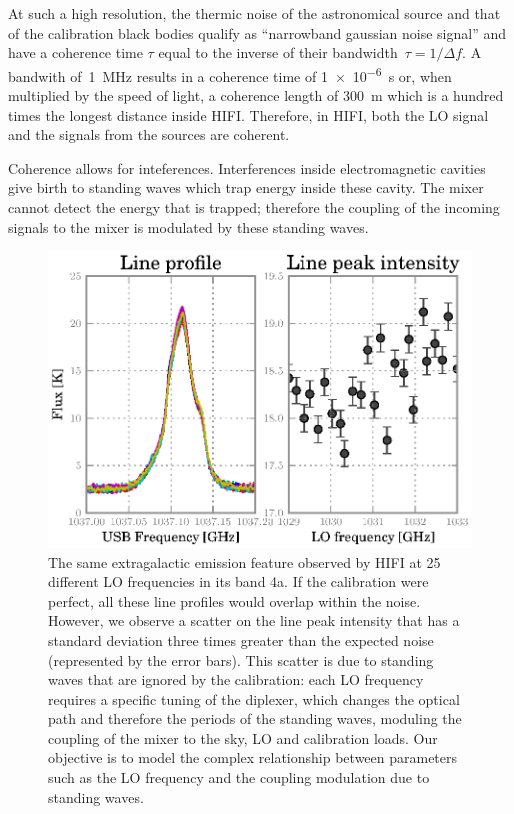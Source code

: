 \documentclass[a4paper,11pt]{article}
\begin{document}
At such a high resolution, the thermic noise of the astronomical source and that of the calibration black bodies qualify as ``narrowband gaussian noise signal'' \cite{siegman1986lasers} and have a coherence time $\tau$ equal to the inverse of their bandwidth~$\tau=1/\Delta f$.
A bandwith of~\SI{1}{\mega\hertz} results in a coherence time of \SI{1e-6}{\second} or, when multiplied by the speed of light, a coherence length of \SI{300}{\meter} which is a hundred times the longest distance inside HIFI.
Therefore, in HIFI, both the LO signal and the signals from the sources are coherent.

Coherence allows for inteferences.
Interferences inside electromagnetic cavities give birth to standing waves which trap energy inside these cavity.
The mixer cannot detect the energy that is trapped; 
therefore the coupling of the incoming signals to the mixer is modulated by these standing waves.

\begin{figure}[hbt]
    \centering
    \includegraphics[width=\textwidth]{obsid_5000352C}
    \caption{\label{fig:scatter_real_data}
    The same extragalactic emission feature observed by HIFI at 25 different LO frequencies in its band 4a.
    If the calibration were perfect, all these line profiles would overlap within the noise.
    However, we observe a scatter on the line peak intensity that has a standard deviation three times greater than the expected noise (represented by the error bars).
    This scatter is due to standing waves that are ignored by the calibration: each LO frequency requires a specific tuning of the diplexer, which changes the optical path and therefore the periods of the standing waves, moduling the coupling of the mixer to the sky, LO and calibration loads.
    Our objective is to model the complex relationship between parameters such as the LO frequency and the coupling modulation due to standing waves.
    }
\end{figure}
\end{document}
